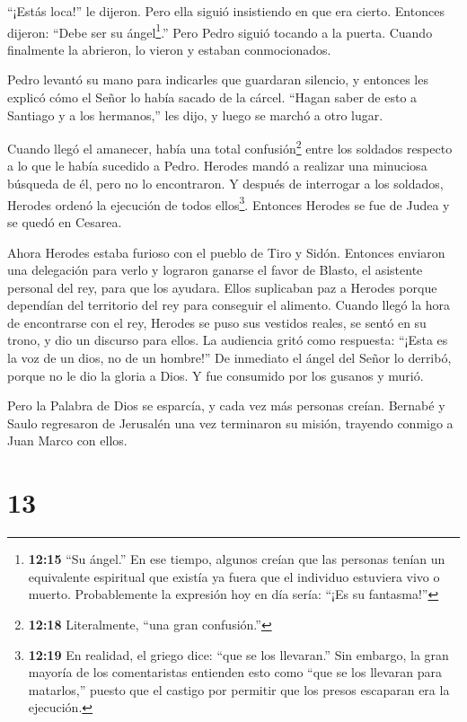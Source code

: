  ``¡Estás loca!'' le dijeron. Pero ella siguió insistiendo
en que era cierto. Entonces dijeron: ``Debe ser su ángel\footnote{\textbf{12:15}
  ``Su ángel.'' En ese tiempo, algunos creían que las personas tenían un
  equivalente espiritual que existía ya fuera que el individuo estuviera
  vivo o muerto. Probablemente la expresión hoy en día sería: ``¡Es su
  fantasma!''}.''  Pero Pedro siguió tocando a la puerta.
Cuando finalmente la abrieron, lo vieron y estaban conmocionados.

 Pedro levantó su mano para indicarles que guardaran
silencio, y entonces les explicó cómo el Señor lo había sacado de la
cárcel. ``Hagan saber de esto a Santiago y a los hermanos,'' les dijo, y
luego se marchó a otro lugar.

 Cuando llegó el amanecer, había una total
confusión\footnote{\textbf{12:18} Literalmente, ``una gran confusión.''}
entre los soldados respecto a lo que le había sucedido a Pedro.
 Herodes mandó a realizar una minuciosa búsqueda de él,
pero no lo encontraron. Y después de interrogar a los soldados, Herodes
ordenó la ejecución de todos ellos\footnote{\textbf{12:19} En realidad,
  el griego dice: ``que se los llevaran.'' Sin embargo, la gran mayoría
  de los comentaristas entienden esto como ``que se los llevaran para
  matarlos,'' puesto que el castigo por permitir que los presos
  escaparan era la ejecución.}. Entonces Herodes se fue de Judea y se
quedó en Cesarea.

 Ahora Herodes estaba furioso con el pueblo de Tiro y
Sidón. Entonces enviaron una delegación para verlo y lograron ganarse el
favor de Blasto, el asistente personal del rey, para que los ayudara.
Ellos suplicaban paz a Herodes porque dependían del territorio del rey
para conseguir el alimento.  Cuando llegó la hora de
encontrarse con el rey, Herodes se puso sus vestidos reales, se sentó en
su trono, y dio un discurso para ellos.  La audiencia gritó
como respuesta: ``¡Esta es la voz de un dios, no de un hombre!''
 De inmediato el ángel del Señor lo derribó, porque no le
dio la gloria a Dios. Y fue consumido por los gusanos y murió.

 Pero la Palabra de Dios se esparcía, y cada vez más
personas creían.  Bernabé y Saulo regresaron de Jerusalén
una vez terminaron su misión, trayendo conmigo a Juan Marco con ellos.

\hypertarget{section-12}{%
\section{13}\label{section-12}}

